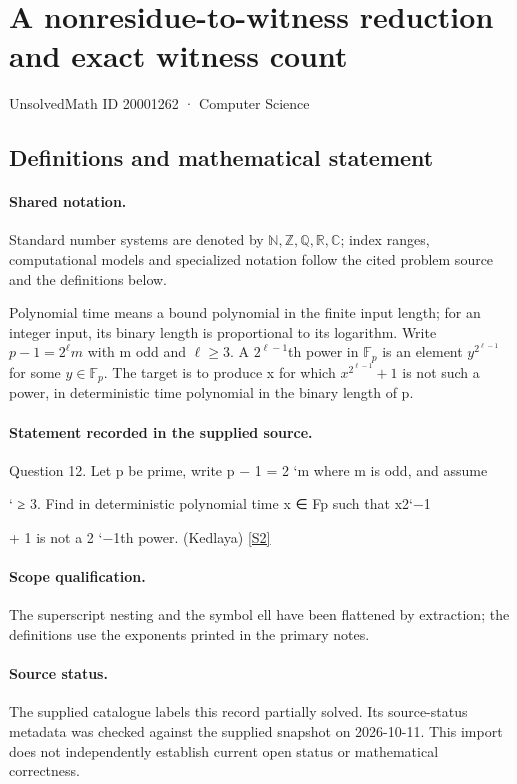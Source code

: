 \documentclass[11pt]{article}
\newcommand{\sref}[2]{\hyperlink{source:#1:#2}{[S#2]}}
\begin{document}
\setcounter{section}{20001261}
\section{A nonresidue-to-witness reduction and exact witness count}\label{20001262}
{\small\sffamily UnsolvedMath ID 20001262 · Computer Science}
\subsection{Definitions and mathematical statement}

\paragraph{Shared notation.}Standard number systems are denoted by $\mathbb N,\mathbb Z,\mathbb Q,\mathbb R,\mathbb C$; index ranges, computational models and specialized notation follow the cited problem source and the definitions below.


Polynomial time means a bound polynomial in the finite input length; for an integer input, its binary length is proportional to its logarithm. Write $p-1=2^\ell m$ with m odd and $\ell\ge3$. A $2^{\ell-1}$th power in $\mathbb F_p$ is an element $y^{2^{\ell-1}}$ for some $y\in\mathbb F_p$. The target is to produce x for which $x^{2^{\ell-1}}+1$ is not such a power, in deterministic time polynomial in the binary length of p.
\paragraph{Statement recorded in the supplied source.}
Question 12. Let p be prime, write p − 1 = 2 `m where m is odd, and assume

` ≥ 3. Find in deterministic polynomial time x ∈ Fp such that x2`−1

+ 1 is not a 2 `−1th power. (Kedlaya) \sref{20001262}{2}
\paragraph{Scope qualification.}
The superscript nesting and the symbol ell have been flattened by extraction; the definitions use the exponents printed in the primary notes.
\paragraph{Source status.}
The supplied catalogue labels this record partially solved. Its source-status metadata was checked against the supplied snapshot on 2026-10-11. This import does not independently establish current open status or mathematical correctness.
\end{document}
